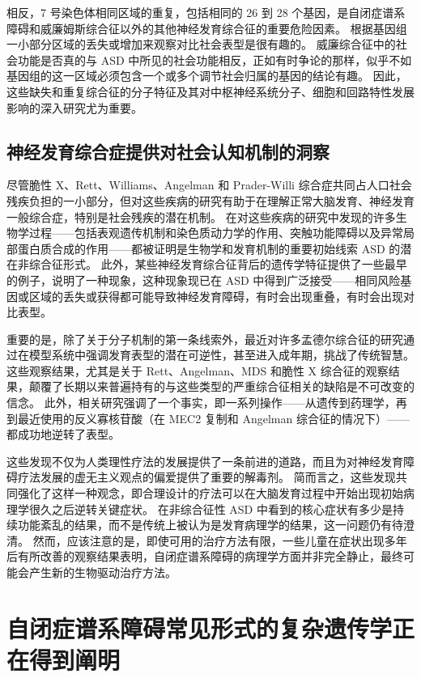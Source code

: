 相反，7 号染色体相同区域的重复，包括相同的 26 到 28 个基因，是自闭症谱系障碍和威廉姆斯综合征以外的其他神经发育综合征的重要危险因素。
根据基因组一小部分区域的丢失或增加来观察对比社会表型是很有趣的。
威廉综合征中的社会功能是否真的与 ASD 中所见的社会功能相反，正如有时争论的那样，似乎不如基因组的这一区域必须包含一个或多个调节社会归属的基因的结论有趣。
因此，这些缺失和重复综合征的分子特征及其对中枢神经系统分子、细胞和回路特性发展影响的深入研究尤为重要。



\subsection{神经发育综合症提供对社会认知机制的洞察}

尽管脆性 X、Rett、Williams、Angelman 和 Prader-Willi 综合症共同占人口社会残疾负担的一小部分，但对这些疾病的研究有助于在理解正常大脑发育、神经发育 一般综合症，特别是社会残疾的潜在机制。
在对这些疾病的研究中发现的许多生物学过程——包括表观遗传机制和染色质动力学的作用、突触功能障碍以及异常局部蛋白质合成的作用——都被证明是生物学和发育机制的重要初始线索 ASD 的潜在非综合征形式。
此外，某些神经发育综合征背后的遗传学特征提供了一些最早的例子，说明了一种现象，这种现象现已在 ASD 中得到广泛接受——相同风险基因或区域的丢失或获得都可能导致神经发育障碍，有时会出现重叠，有时会出现对比表型。


重要的是，除了关于分子机制的第一条线索外，最近对许多孟德尔综合征的研究通过在模型系统中强调发育表型的潜在可逆性，甚至进入成年期，挑战了传统智慧。
这些观察结果，尤其是关于 Rett、Angelman、MDS 和脆性 X 综合征的观察结果，颠覆了长期以来普遍持有的与这些类型的严重综合征相关的缺陷是不可改变的信念。
此外，相关研究强调了一个事实，即一系列操作——从遗传到药理学，再到最近使用的反义寡核苷酸（在 MEC2 复制和 Angelman 综合征的情况下）——都成功地逆转了表型。


这些发现不仅为人类理性疗法的发展提供了一条前进的道路，而且为对神经发育障碍疗法发展的虚无主义观点的偏爱提供了重要的解毒剂。
简而言之，这些发现共同强化了这样一种观念，即合理设计的疗法可以在大脑发育过程中开始出现初始病理学很久之后逆转关键症状。
在非综合征性 ASD 中看到的核心症状有多少是持续功能紊乱的结果，而不是传统上被认为是发育病理学的结果，这一问题仍有待澄清。
然而，应该注意的是，即使可用的治疗方法有限，一些儿童在症状出现多年后有所改善的观察结果表明，自闭症谱系障碍的病理学方面并非完全静止，最终可能会产生新的生物驱动治疗方法。



\section{自闭症谱系障碍常见形式的复杂遗传学正在得到阐明}

